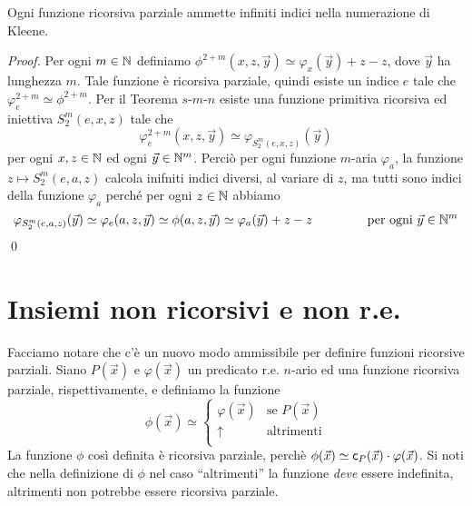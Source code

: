 \documentclass[runningheads,a4paper]{llncs}
\begin{document}
\begin{lemma}[Padding]\label{lem:padding}
Ogni funzione ricorsiva parziale ammette infiniti indici nella numerazione di Kleene.
\end{lemma}

\begin{proof}
Per ogni $m\in \mathbb{N}$ definiamo $\phi^{2+m}(x,z,\vec y) \simeq \varphi_x(\vec y)+z-z$, dove $\vec y$ ha lunghezza $m$.
 Tale funzione \`{e} ricorsiva parziale, quindi esiste un indice $e$ tale che $\varphi_e^{2+m} \simeq \phi^{2+m}$.
 Per il Teorema $s$-$m$-$n$ esiste una funzione primitiva ricorsiva ed iniettiva $S_2^{m}(e,x,z)$ tale che 
 $$ \varphi_e^{2+m}(x,z,\vec y)\simeq\varphi_{S_2^m(e,x,z)}(\vec y)$$
per ogni $x,z \in \mathbb{N}$ ed ogni $\vec y \in \mathbb{N}^m$.
Perci\`{o} per ogni funzione $m$-aria $\varphi_a$, la funzione $z \mapsto S_2^m(e,a,z)$ calcola inifniti indici diversi, al variare 
 di $z$, ma tutti sono indici della funzione $\varphi_a$ perch\'{e} per ogni $z \in \mathbb{N}$ abbiamo
$$ \varphi_{S_2^m(e,a,z)}(\vec y) \simeq \varphi_e(a,z,\vec y) \simeq \phi(a,z,\vec y) \simeq \varphi_a(\vec y)+z-z \qquad \qquad \text{ per ogni } \vec y \in \mathbb{N}^m $$
\qed\end{proof}


\section{Insiemi non ricorsivi e non r.e.}

Facciamo notare che c'\`{e} un nuovo modo ammissibile per definire funzioni ricorsive parziali. Siano $P(\vec x)$ e
 $\varphi(\vec x)$ un predicato r.e. $n$-ario ed una funzione ricorsiva parziale, rispettivamente, e definiamo la funzione
$$
\phi(\vec x) \simeq
\begin{cases}
\varphi(\vec x) & \mbox{se $P(\vec x)$} \\
\uparrow               & \mbox{altrimenti} \\
\end{cases}
$$
La funzione $\phi$ cos\`{i} definita \`{e} ricorsiva parziale, perch\`{e} $\phi(\vec x) \simeq \mathsf{c}_{P}(\vec x) \cdot \varphi(\vec x)$.
 Si noti che nella definizione di $\phi$ nel caso ``altrimenti'' la funzione \emph{deve} essere indefinita, altrimenti non potrebbe
 essere ricorsiva parziale.
\end{document}
